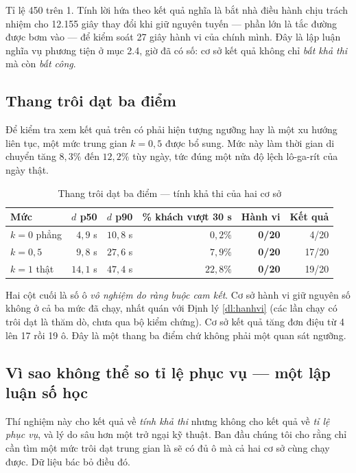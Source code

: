 Tỉ lệ 450 trên 1. Tính lời hứa theo kết quả nghĩa là bắt nhà điều hành chịu trách nhiệm cho
12.155 giây thay đổi khi giữ nguyên tuyến --- phần lớn là tắc đường được bơm vào --- để kiểm soát
27 giây hành vi của chính mình. Đây là lập luận nghĩa vụ
phương tiện ở mục 2.4, giờ đã có số: cơ sở kết quả không chỉ \emph{bất khả thi} mà còn
\emph{bất công}.

\subsection{Thang trôi dạt ba điểm}

Để kiểm tra xem kết quả trên có phải hiện tượng ngưỡng hay là một xu hướng liên tục, một mức
trung gian $k = 0{,}5$ được bổ sung. Mức này làm thời gian di chuyển tăng $8{,}3\%$ đến
$12{,}2\%$ tùy ngày, tức đúng một nửa độ lệch lô-ga-rít của ngày thật.

\begin{table}[htbp]
\centering
\caption{Thang trôi dạt ba điểm --- tính khả thi của hai cơ sở}
\label{bang:thang-troidat}
\small
\begin{tabular}{@{}lrrrrr@{}}
\toprule
\textbf{Mức} & $d$ \textbf{p50} & $d$ \textbf{p90} & \textbf{\% khách vượt 30 s} & \textbf{Hành vi} & \textbf{Kết quả}\\
\midrule
$k=0$ phẳng & $4{,}9$ s & $10{,}8$ s & $0{,}2\%$ & \textbf{0/20} & 4/20\\
$k=0{,}5$ & $9{,}8$ s & $27{,}6$ s & $7{,}9\%$ & \textbf{0/20} & 17/20\\
$k=1$ thật & $14{,}1$ s & $47{,}4$ s & $22{,}8\%$ & \textbf{0/20} & 19/20\\
\bottomrule
\end{tabular}
\end{table}

Hai cột cuối là số ô \emph{vô nghiệm do ràng buộc cam kết}. Cơ sở hành vi giữ nguyên số không ở
cả ba mức đã chạy, nhất quán với Định lý \ref{dl:hanhvi} (các lần chạy có trôi dạt là thăm dò, chưa qua
bộ kiểm chứng). Cơ sở kết quả tăng đơn điệu từ 4 lên 17 rồi
19 ô. Đây là một thang ba điểm chứ không phải một quan sát ngưỡng.

\subsection{Vì sao không thể so tỉ lệ phục vụ --- một lập luận số học}

Thí nghiệm này cho kết quả về \emph{tính khả thi} nhưng không cho kết quả về \emph{tỉ lệ phục
vụ}, và lý do sâu hơn một trở ngại kỹ thuật. Ban đầu chúng tôi cho rằng chỉ cần tìm một mức
trôi dạt trung gian là sẽ có đủ ô mà cả hai cơ sở cùng chạy được. Dữ liệu bác bỏ điều đó.


